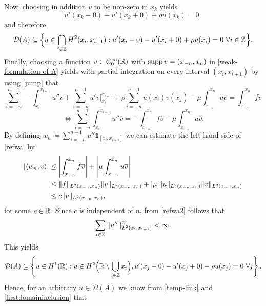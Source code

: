 Now, choosing in addition $v$ to be non-zero in $x_{k}$ yields 
	\begin{equation}
		u'(x_{k}-0) - u'(x_{k}+0) + \rho u(x_{k}) = 0, \label{jump}
	\end{equation} 
and therefore
	\begin{equation}
		\mathcal{D}(A) \subseteq \Big\{ u \in \bigcap_{i \in \mathbb{Z}} H^{2}(x_{i}, x_{i+1}) : u'(x_{i} - 0) - u'(x_{i} + 0) + \rho u(x_{i}) = 0 ~\forall i \in \mathbb{Z} \Big\}.
	\end{equation} 
Finally, choosing a function $v \in C_{0}^{\infty}(\mathbb{R})$ with $\operatorname{supp} v = (x_{-n}, x_{n})$ in \eqref{weak-formulation-of-A} yields with partial integration on every interval $(x_{i}, x_{i+1})$ by using \eqref{jump} that
\[ \sum_{i=-n}^{n-1} -\int_{x_{i}}^{x_{i+1}} u'' \overline{v} + \sum_{i=-n}^{n-1} u' \overline{v} \Big|_{x_{i}}^{x_{i+1}} + \rho \sum_{i=-n}^{n-1} u(x_{i}) \overline{v(x_{j})} - \mu \int_{x_{-n}}^{x_{n}} u \overline{v} = \int_{x_{-n}}^{x_{n}} f \overline{v} \]
\begin{equation} %
	\iff \sum_{i=-n}^{n-1} \int_{x_{i}}^{x_{i+1}} u'' \overline{v} = - \int_{x_{-n}}^{x_{n}} f \overline{v} - \mu \int_{x_{-n}}^{x_{n}} u \overline{v}. \label{refwa}
\end{equation} 
By defining $w_{n} \coloneqq \sum_{i=-n}^{n-1} u'' \mathds{1}_{[x_{i}, x_{i+1}]}$ we can estimate the left-hand side of \eqref{refwa} by
\begin{align}
	\left| \langle w_{n}, v \rangle \right| & \leq \left| \int_{x_{-n}}^{x_{n}} f \overline{v} \right| + \left| \mu \int_{x_{-n}}^{x_{n}} u \overline{v} \right|  \notag \\
		& \leq \|f\|_{L^{2}(x_{-n}, x_{n})} \|v\|_{L^{2}(x_{-n}, x_{n})} + |\mu| \|u\|_{L^{2}(x_{-n}, x_{n})} \|v\|_{L^{2}(x_{-n}, x_{n})} \notag \\
		& \leq c \|v\|_{L^{2}(x_{-n}, x_{n})}, \label{refwa2}
\end{align}
for some $c \in \mathbb{R}$. Since $c$ is independent of $n$, from \eqref{refwa2} follows that
	\[ \sum_{i \in \mathbb{Z}} \|u''\|^{2}_{L^{2}(x_{i}, x_{i+1})} < \infty. \]
This yields
	\begin{equation}
		\mathcal{D}(A) \subseteq \left\{ u \in H^{1}(\mathbb{R}): u \in H^{2}\Big(\mathbb{R} \setminus \bigcup_{i \in \mathbb{Z}} x_{i} \Big), u'(x_{j} - 0) - u'(x_{j} + 0) - \rho u(x_{j}) = 0 ~\forall j \right\}. \label{firstdomaininclusion} 
	\end{equation}
Hence, for an arbitrary $u \in \mathcal{D}(A)$ we know from \eqref{temp-link} and \eqref{firstdomaininclusion} that
